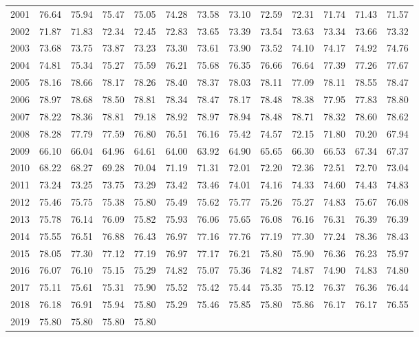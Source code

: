 \begin{longtable}{rrrrrrrrrrrrr}
  2001 & 76.64 & 75.94 & 75.47 & 75.05 & 74.28 & 73.58 & 73.10 & 72.59 & 72.31 & 71.74 & 71.43 & 71.57 \\ 
  2002 & 71.87 & 71.83 & 72.34 & 72.45 & 72.83 & 73.65 & 73.39 & 73.54 & 73.63 & 73.34 & 73.66 & 73.32 \\ 
  2003 & 73.68 & 73.75 & 73.87 & 73.23 & 73.30 & 73.61 & 73.90 & 73.52 & 74.10 & 74.17 & 74.92 & 74.76 \\ 
  2004 & 74.81 & 75.34 & 75.27 & 75.59 & 76.21 & 75.68 & 76.35 & 76.66 & 76.64 & 77.39 & 77.26 & 77.67 \\ 
  2005 & 78.16 & 78.66 & 78.17 & 78.26 & 78.40 & 78.37 & 78.03 & 78.11 & 77.09 & 78.11 & 78.55 & 78.47 \\ 
  2006 & 78.97 & 78.68 & 78.50 & 78.81 & 78.34 & 78.47 & 78.17 & 78.48 & 78.38 & 77.95 & 77.83 & 78.80 \\ 
  2007 & 78.22 & 78.36 & 78.81 & 79.18 & 78.92 & 78.97 & 78.94 & 78.48 & 78.71 & 78.32 & 78.60 & 78.62 \\ 
  2008 & 78.28 & 77.79 & 77.59 & 76.80 & 76.51 & 76.16 & 75.42 & 74.57 & 72.15 & 71.80 & 70.20 & 67.94 \\ 
  2009 & 66.10 & 66.04 & 64.96 & 64.61 & 64.00 & 63.92 & 64.90 & 65.65 & 66.30 & 66.53 & 67.34 & 67.37 \\ 
  2010 & 68.22 & 68.27 & 69.28 & 70.04 & 71.19 & 71.31 & 72.01 & 72.20 & 72.36 & 72.51 & 72.70 & 73.04 \\ 
  2011 & 73.24 & 73.25 & 73.75 & 73.29 & 73.42 & 73.46 & 74.01 & 74.16 & 74.33 & 74.60 & 74.43 & 74.83 \\ 
  2012 & 75.46 & 75.75 & 75.38 & 75.80 & 75.49 & 75.62 & 75.77 & 75.26 & 75.27 & 74.83 & 75.67 & 76.08 \\ 
  2013 & 75.78 & 76.14 & 76.09 & 75.82 & 75.93 & 76.06 & 75.65 & 76.08 & 76.16 & 76.31 & 76.39 & 76.39 \\ 
  2014 & 75.55 & 76.51 & 76.88 & 76.43 & 76.97 & 77.16 & 77.76 & 77.19 & 77.30 & 77.24 & 78.36 & 78.43 \\ 
  2015 & 78.05 & 77.30 & 77.12 & 77.19 & 76.97 & 77.17 & 76.21 & 75.80 & 75.90 & 76.36 & 76.23 & 75.97 \\ 
  2016 & 76.07 & 76.10 & 75.15 & 75.29 & 74.82 & 75.07 & 75.36 & 74.82 & 74.87 & 74.90 & 74.83 & 74.80 \\ 
  2017 & 75.11 & 75.61 & 75.31 & 75.90 & 75.52 & 75.42 & 75.44 & 75.35 & 75.12 & 76.37 & 76.36 & 76.44 \\ 
  2018 & 76.18 & 76.91 & 75.94 & 75.80 & 75.29 & 75.46 & 75.85 & 75.80 & 75.86 & 76.17 & 76.17 & 76.55 \\ 
  2019 & 75.80 & 75.80 & 75.80 & 75.80 &  &  &  &  &  &  &  &  \\ 
   \hline
\hline
\end{longtable}
